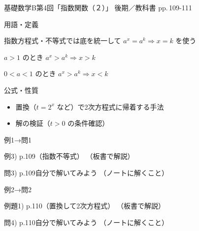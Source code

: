\documentclass[aspectratio=43,professionalfonts,handout]{beamer}
\newcommand{\LectureNum}{4}
\newcommand{\LectureTitle}{指数関数（２）}
\newcommand{\TextPages}{pp.\,109-111}
\newcommand{\CourseName}{基礎数学B}
\renewcommand{\TermName}{後期}
\begin{document}
\begin{frame}{\CourseName\quad 第\LectureNum 回「\LectureTitle 」}
  {\small \TermName\quad \TeacherName\quad ／\quad 教科書 \TextPages}

  \begin{block}{用語・定義}
  \begin{description}[labelwidth=5.5em]
    \item[\kw{底をそろえる：$a^x = a^k \Rightarrow x = k$}] 指数方程式・不等式では底を統一して $a^x = a^k \Rightarrow x = k$ を使う
    \item[\kw{底が1より大：不等号の向きはそのまま}] $a > 1$ のとき $a^x > a^k \Rightarrow x > k$
    \item[\kw{底が1より小：不等号の向きが逆転}] $0 < a < 1$ のとき $a^x > a^k \Rightarrow x < k$
  \end{description}
  \end{block}
\end{frame}

\begin{frame}{公式・性質}
  \begin{block}{}
  \begin{itemize}
    \item 置換（$t = 2^x$ など）で2次方程式に帰着する手法
    \item 解の検証（$t > 0$ の条件確認）
  \end{itemize}
  \end{block}
\end{frame}

\begin{frame}{例1→問1}
  \begin{exampleblock}{例3) p.109（指数不等式）}
    （板書で解説）
  \end{exampleblock}

  \vfill

  \begin{block}{問3) p.109\quad 自分で解いてみよう}
    （ノートに解くこと）
  \end{block}
\end{frame}

\begin{frame}{例2→問2}
  \begin{exampleblock}{例題1) p.110（置換して2次方程式）}
    （板書で解説）
  \end{exampleblock}

  \vfill

  \begin{block}{問4) p.110\quad 自分で解いてみよう}
    （ノートに解くこと）
  \end{block}
\end{frame}
\end{document}
